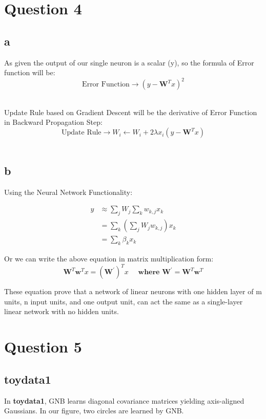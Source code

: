 \documentclass{article}
\begin{document}
\pagebreak

\section{Question 4}

\subsection{a}

As given the output of our single neuron is a scalar (y), so the formula of Error function will be: $$\text{Error Function} \rightarrow (y - \textbf{W}^Tx)^2 $$ \\

\bigskip

Update Rule based on Gradient Descent will be the derivative of Error Function in Backward Propagation Step: $$\text{Update Rule} \rightarrow  W_i \leftarrow W_i + 2 \lambda x_i (y - \textbf{W}^Tx) $$ \\


\subsection{b}
Using the Neural Network Functionality: 

\begin{align*}
y &\approx \sum_{j} W_j \sum_{k} w_{k,j}x_k \\
&= \sum_{k} \left(\sum_{j} W_j w_{k,j}\right) x_k \\
&= \sum_{k} \beta_k x_k
\end{align*}

Or we can write the above equation in matrix multiplication form:
\[
\mathbf{W}^T\mathbf{w}^Tx = (\mathbf{W}^{'})^Tx \quad  \textbf{  where  } \mathbf{W}^{'} = \mathbf{W}^T\mathbf{w}^T
\]

\bigskip

These equation prove that a network of linear neurons with one hidden layer of m units, n input units, and one output unit, can act the same as a single-layer linear network with no hidden units.

\pagebreak

\section{Question 5}

\subsection{toydata1}
In \textbf{toydata1}, GNB learns diagonal covariance matrices yielding axis-aligned Gaussians. In our figure, two circles are learned by GNB.
\end{document}
